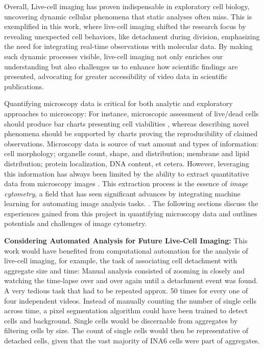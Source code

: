 Overall, Live-cell imaging has proven indispensable in exploratory cell biology,
uncovering dynamic cellular phenomena that static analyses often miss. This is
exemplified in this work, where live-cell imaging shifted the research focus
by revealing unexpected cell behaviors, like detachment during division,
emphasizing the need for integrating real-time observations with molecular data.
By making such dynamic processes visible, live-cell imaging not only enriches
our understanding but also challenges us to enhance how scientific findings are
presented, advocating for greater accessibility of video data in scientific
publications.

\newpage


%
\label{sec:discussion_quantifying_microscopy}%
Quantifying microscopy data is critical for both analytic and exploratory
approaches to microscopy: For instance, microscopic assessment of live/dead
cells should produce bar charts presenting cell viabilities
\cite{spaepenDigitalImageProcessing2011}, whereas describing novel phenomena
should be supported by charts proving the reproducibility of claimed
observations. Microscopy data is source of vast amount and types of information:
cell morphology; organelle count, shape, and distribution; membrane and lipid
distribution; protein localization, DNA content, et cetera. However, leveraging
this information has always been limited by the ability to extract quantitative
data from microscopy images \cite{galbraithPumpingVolume2023}. This extraction
process is the essence of \emph{image cytometry}, a field that has seen significant
advances by integrating machine learning for automating image analysis tasks.
\cite{guptaDeepLearningImage2019}. The following sections discuss the
experiences gained from this project in quantifying microscopy data and outlines
potentials and challenges of image cytometry.





\textbf{Considering Automated Analysis for Future Live-Cell Imaging:}
This work would have benefited from
computational automation for the analysis of live-cell imaging, for example, the
task of associating \INA cell detachment with \INA aggregate size and time:
Manual analysis consisted of zooming in closely and
watching the time-lapse over and over again until a detachment event was found.
A very tedious task that had to be repeated approx. 50 times for every one of
four independent videos. Instead of manually counting the number of single \INA
cells across time, a pixel segmentation algorithm could have been trained to
detect cells and background. Single cells would be discernable from aggregates
by filtering cells by size. The count of single cells would then be
representative of detached cells, given that the vast majority of INA6 cells
were part of aggregates.


